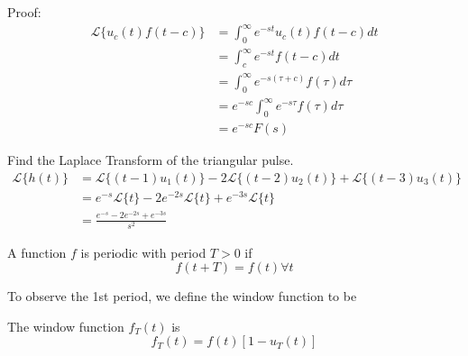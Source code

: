 \documentclass[12pt]{article}
\begin{document}
Proof:
\begin{align*}
	\mathcal{L}\{u_c(t)f(t-c)\} &= \int_0^\infty e^{-st}u_c(t)f(t-c)dt \\
				    &= \int_c^\infty e^{-st}f(t-c)dt \\
				    &= \int_0^\infty e^{-s(\tau + c)} f(\tau)d\tau \\
				    &= e^{-sc} \int_0^\infty e^{-s\tau}f(\tau)d\tau \\
				    &= e^{-sc}F(s)
\end{align*}

\begin{ex}
	Find the Laplace Transform of the triangular pulse.
	\begin{align*}
		\mathcal{L}\{h(t)\} &= \mathcal{L}\{(t-1)u_1(t)\} - 2\mathcal{L}\{(t-2)u_2(t)\} + \mathcal{L}\{(t-3)u_3(t)\} \\
				    &= e^{-s}\mathcal{L}\{t\} - 2e^{-2s}\mathcal{L}\{t\} + e^{-3s}\mathcal{L}\{t\} \\
				    &= \frac{e^{-s}-2e^{-2s}+e^{-3s}}{s^2}
	\end{align*}
\end{ex}

\begin{defn}
	A function $f$ is periodic with period $T > 0$ if
	$$f(t+T) = f(t) \forall t$$
\end{defn}

To observe the 1st period, we define the window function to be

\begin{defn}
	The window function $f_T(t)$ is
	$$f_T(t) = f(t)[1-u_T(t)]$$
\end{defn}
\end{document}
